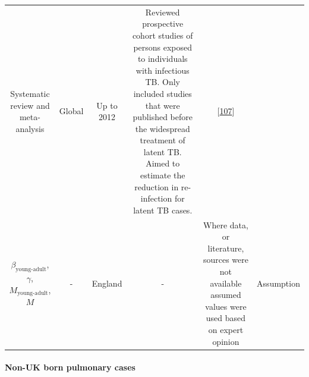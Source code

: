 \documentclass[11pt,twoside]{bristolthesis}
\begin{document}
\begin{longtable}[]{@{}cccccc@{}}
\begin{minipage}[t]{0.10\columnwidth}
  Systematic
  review and
  meta-analysis\strut
  \end{minipage} & \begin{minipage}[t]{0.07\columnwidth}\centering
  Global\strut
  \end{minipage} & \begin{minipage}[t]{0.07\columnwidth}\centering
  Up to
  2012\strut
  \end{minipage} & \begin{minipage}[t]{0.27\columnwidth}\centering
  Reviewed prospective cohort studies of
  persons exposed to individuals with
  infectious TB. Only included studies
  that were published before the
  widespread treatment of latent TB. Aimed
  to estimate the reduction in
  re-infection for latent TB cases.\strut
  \end{minipage} & \begin{minipage}[t]{0.11\columnwidth}\centering
  {[}\protect\hyperlink{ref-Andrews2012}{107}{]}\strut
  \end{minipage}\tabularnewline
  \begin{minipage}[t]{0.21\columnwidth}\centering
  \(\beta_{\text{young-adult}}\),
  \(\gamma\),
  \(M_{\text{young-adult}}\),
  \(M\)\strut
  \end{minipage} & \begin{minipage}[t]{0.10\columnwidth}\centering
  -\strut
  \end{minipage} & \begin{minipage}[t]{0.07\columnwidth}\centering
  England\strut
  \end{minipage} & \begin{minipage}[t]{0.07\columnwidth}\centering
  -\strut
  \end{minipage} & \begin{minipage}[t]{0.27\columnwidth}\centering
  Where data, or literature, sources were
  not available assumed values were used
  based on expert opinion\strut
  \end{minipage} & \begin{minipage}[t]{0.11\columnwidth}\centering
  Assumption\strut
  \end{minipage}\tabularnewline
  \bottomrule
  \end{longtable}
  \hypertarget{non-uk-born-pulmonary-cases}{%
  \paragraph{Non-UK born pulmonary cases}\label{non-uk-born-pulmonary-cases}}
  
\end{document}

